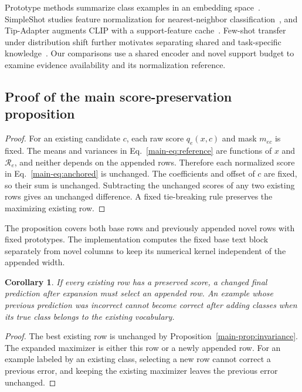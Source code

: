 \documentclass[preprint,review,12pt]{elsarticle}
\newtheorem{corollary}{Corollary}
\begin{document}
Prototype methods summarize class examples in an embedding space~\cite{snell2017prototypical}. SimpleShot studies feature normalization for nearest-neighbor classification~\cite{wang2019simpleshot}, and Tip-Adapter augments CLIP with a support-feature cache~\cite{zhang2022tipadapter}. Few-shot transfer under distribution shift further motivates separating shared and task-specific knowledge~\cite{zhu2023combat}. Our comparisons use a shared encoder and novel support budget to examine evidence availability and its normalization reference.

\subsection{Proof of the main score-preservation proposition}
\begin{proof}
For an existing candidate $c$, each raw score $q_e(x,c)$ and mask $m_{ec}$ is fixed. The means and variances in Eq.~\eqref{main-eq:reference} are functions of $x$ and $\mathcal R_e$, and neither depends on the appended rows. Therefore each normalized score in Eq.~\eqref{main-eq:anchored} is unchanged. The coefficients and offset of $c$ are fixed, so their sum is unchanged. Subtracting the unchanged scores of any two existing rows gives an unchanged difference. A fixed tie-breaking rule preserves the maximizing existing row.
\end{proof}

The proposition covers both base rows and previously appended novel rows with fixed prototypes. The implementation computes the fixed base text block separately from novel columns to keep its numerical kernel independent of the appended width.

\begin{corollary}
If every existing row has a preserved score, a changed final prediction after expansion must select an appended row. An example whose previous prediction was incorrect cannot become correct after adding classes when its true class belongs to the existing vocabulary.
\label{cor:competition}
\end{corollary}
\begin{proof}
The best existing row is unchanged by Proposition~\ref{main-prop:invariance}. The expanded maximizer is either this row or a newly appended row. For an example labeled by an existing class, selecting a new row cannot correct a previous error, and keeping the existing maximizer leaves the previous error unchanged.
\end{proof}
\end{document}
